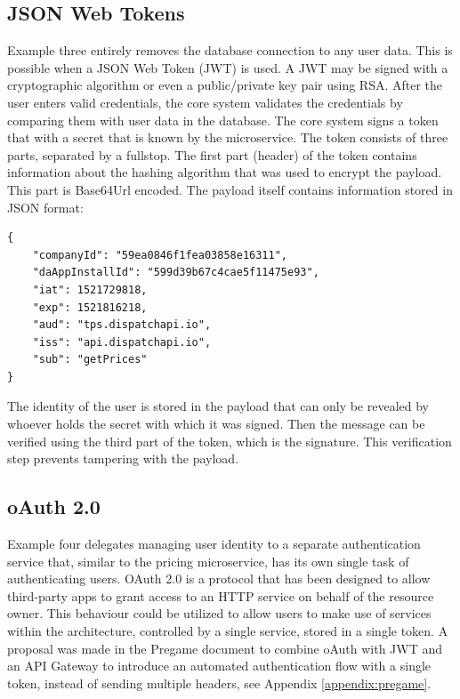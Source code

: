 \subsection{JSON Web Tokens}
Example three entirely removes the database connection to any user data. This is possible when a JSON Web Token (JWT) is used. A JWT may be signed with a cryptographic algorithm or even a public/private key pair using RSA. After the user enters valid credentials, the core system validates the credentials by comparing them with user data in the database. The core system signs a token that with a secret that is known by the microservice. The token consists of three parts, separated by a fullstop. The first part (header) of the token contains information about the hashing algorithm that was used to encrypt the payload. This part is Base64Url encoded. The payload itself contains information stored in JSON format:


\begin{center}
\end{center}

\begin{Verbatim}[fontsize=\scriptsize]
{
	"companyId": "59ea0846f1fea03858e16311",
	"daAppInstallId": "599d39b67c4cae5f11475e93",
	"iat": 1521729818,
	"exp": 1521816218,
	"aud": "tps.dispatchapi.io",
	"iss": "api.dispatchapi.io",
	"sub": "getPrices"
}
\end{Verbatim}

The identity of the user is stored in the payload that can only be revealed by whoever holds the secret with which it was signed. Then the message can be verified using the third part of the token, which is the signature. This verification step prevents tampering with the payload.

\subsection{oAuth 2.0}
Example four delegates managing user identity to a separate authentication service that, similar to the pricing microservice, has its own single task of authenticating users. OAuth 2.0 is a protocol that has been designed to allow third-party apps to grant access to an HTTP service on behalf of the resource owner. This behaviour could be utilized to allow users to make use of services within the architecture, controlled by a single service, stored in a single token. A proposal was made in the Pregame document to combine oAuth with JWT and an API Gateway to introduce an automated authentication flow with a single token, instead of sending multiple headers, see Appendix \ref{appendix:pregame}.

